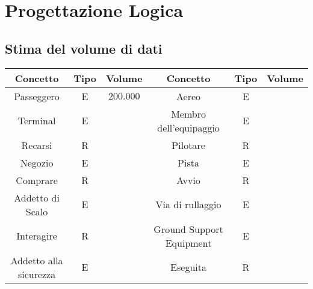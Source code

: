 
\newpage

\section{Progettazione Logica} %

\subsection{Stima del volume di dati}

\begin{tabular}{ | c  c  c | c  c  c | } %
	\hline
	\textbf{Concetto} & \textbf{Tipo} & \textbf{Volume} & \textbf{Concetto} & \textbf{Tipo} & \textbf{Volume}\\
	\hline
	\textsf{\small Passeggero} & \textsf{\small E} & \textsf{\small $ 200.000$} & \textsf{\small Aereo} & \textsf{\small E} & \textsf{\small $ $}\\
	\hline
	\textsf{\small Terminal} & \textsf{\small E} & \textsf{\small $ $} & \textsf{\small Membro dell'equipaggio} & \textsf{\small E} & \textsf{\small $ $}\\
	\hline
	\textsf{\small Recarsi} & \textsf{\small R} & \textsf{\small $ $} & \textsf{\small Pilotare} & \textsf{\small R} & \textsf{\small $ $}\\
	\hline
	\textsf{\small Negozio} & \textsf{\small E} & \textsf{\small $ $} & \textsf{\small Pista} & \textsf{\small E} & \textsf{\small $ $}\\
	\hline
	\textsf{\small Comprare} & \textsf{\small R} & \textsf{\small $ $} & \textsf{\small Avvio} & \textsf{\small R} & \textsf{\small $ $}\\
	\hline
	\textsf{\small Addetto di Scalo} & \textsf{\small E} & \textsf{\small $ $} & \textsf{\small Via di rullaggio} & \textsf{\small E} & \textsf{\small $ $}\\
	\hline
	\textsf{\small Interagire} & \textsf{\small R} & \textsf{\small $ $} & \textsf{\small Ground Support Equipment} & \textsf{\small E} & \textsf{\small $ $}\\
	\hline
	\textsf{\small Addetto alla sicurezza} & \textsf{\small E} & \textsf{\small $ $} & \textsf{\small Eseguita} & \textsf{\small R} & \textsf{\small $ $}\\

\end{tabular}
